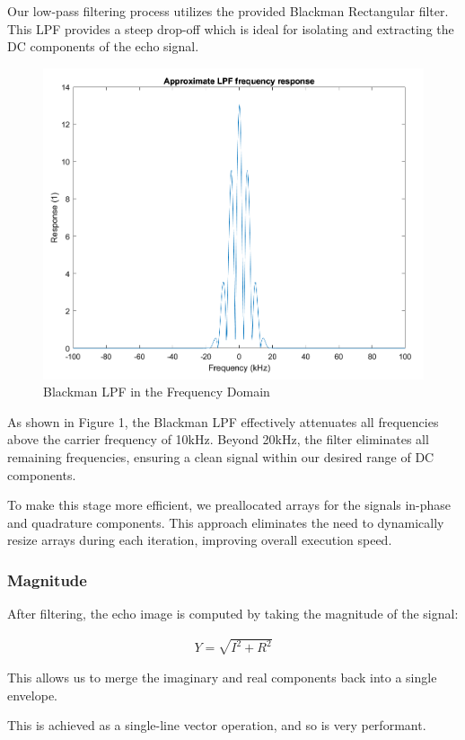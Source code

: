 Our low-pass filtering process utilizes the provided Blackman Rectangular filter. This LPF provides 
a steep drop-off which is ideal for isolating and extracting the DC components of the echo signal.

\begin{figure}[H]
    \centering
    \includegraphics[width=0.5\linewidth]{figures/quad_lpf.png}
    \caption{Blackman LPF in the Frequency Domain}
    \label{fig:blackman_lpf}
\end{figure}

As shown in Figure 1, the Blackman LPF effectively attenuates all frequencies above the carrier
frequency of 10kHz. Beyond 20kHz, the filter eliminates all remaining frequencies, ensuring a 
clean signal within our desired range of DC components.

To make this stage more efficient, we preallocated arrays for the signals in-phase and quadrature
components. This approach eliminates the need to dynamically resize arrays during each iteration,
improving overall execution speed.


\subsubsection{Magnitude}

After filtering, the echo image is computed by taking the magnitude of the signal: 

\begin{align*}
    Y = \sqrt{I^2 + R^2}
\end{align*}

This allows us to merge the imaginary and real components back into a single envelope.

This is achieved as a single-line vector operation, and so is very performant.